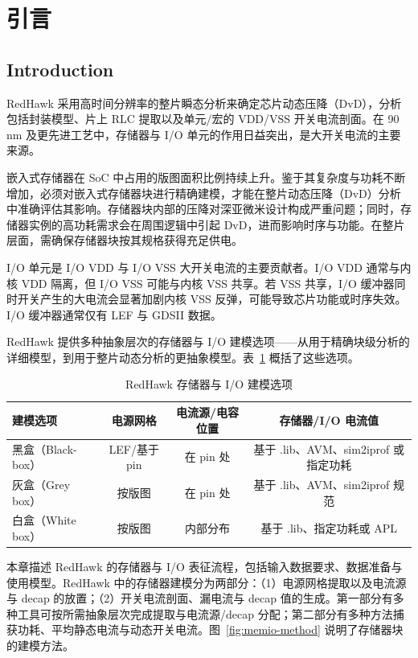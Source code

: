 ﻿%
\label{chap:memio}

\section{引言}
\subsection*{Introduction}

RedHawk 采用高时间分辨率的整片瞬态分析来确定芯片动态压降（DvD），分析包括封装模型、片上 RLC 提取以及单元/宏的 VDD/VSS 开关电流剖面。在 90\,nm 及更先进工艺中，存储器与 I/O 单元的作用日益突出，是大开关电流的主要来源。

嵌入式存储器在 SoC 中占用的版图面积比例持续上升。鉴于其复杂度与功耗不断增加，必须对嵌入式存储器块进行精确建模，才能在整片动态压降（DvD）分析中准确评估其影响。存储器块内部的压降对深亚微米设计构成严重问题；同时，存储器实例的高功耗需求会在周围逻辑中引起 DvD，进而影响时序与功能。在整片层面，需确保存储器块按其规格获得充足供电。

I/O 单元是 I/O VDD 与 I/O VSS 大开关电流的主要贡献者。I/O VDD 通常与内核 VDD 隔离，但 I/O VSS 可能与内核 VSS 共享。若 VSS 共享，I/O 缓冲器同时开关产生的大电流会显著加剧内核 VSS 反弹，可能导致芯片功能或时序失效。I/O 缓冲器通常仅有 LEF 与 GDSII 数据。

RedHawk 提供多种抽象层次的存储器与 I/O 建模选项——从用于精确块级分析的详细模型，到用于整片动态分析的更抽象模型。表~\ref{tab:memio-options} 概括了这些选项。

\begin{table}[htbp]
\centering
\caption{RedHawk 存储器与 I/O 建模选项}
\label{tab:memio-options}
\small
\begin{tabular}{lccc}
\toprule
\textbf{建模选项} & \textbf{电源网格} & \textbf{电流源/电容位置} & \textbf{存储器/I/O 电流值} \\
\midrule
黑盒（Black-box） & LEF/基于 pin & 在 pin 处 & 基于 .lib、AVM、sim2iprof 或指定功耗 \\
灰盒（Grey box） & 按版图 & 在 pin 处 & 基于 .lib、AVM、sim2iprof 规范 \\
白盒（White box） & 按版图 & 内部分布 & 基于 .lib、指定功耗或 APL \\
\bottomrule
\end{tabular}
\end{table}

本章描述 RedHawk 的存储器与 I/O 表征流程，包括输入数据要求、数据准备与使用模型。RedHawk 中的存储器建模分为两部分：（1）电源网格提取以及电流源与 decap 的放置；（2）开关电流剖面、漏电流与 decap 值的生成。第一部分有多种工具可按所需抽象层次完成提取与电流源/decap 分配；第二部分有多种方法捕获功耗、平均静态电流与动态开关电流。图~\ref{fig:memio-method} 说明了存储器块的建模方法。

